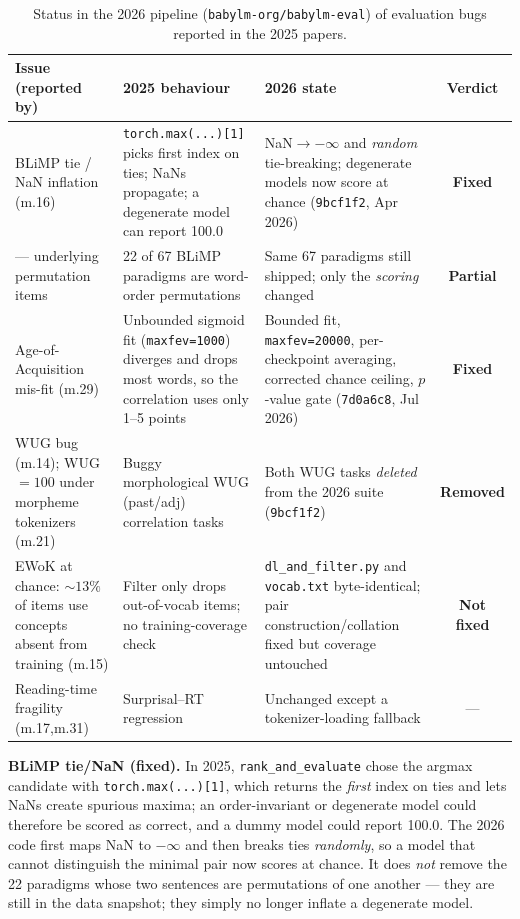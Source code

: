 \documentclass[11pt]{article}
\newcommand{\fixed}{\textcolor{green!55!black}{\textbf{Fixed}}}
\newcommand{\partialx}{\textcolor{orange!85!black}{\textbf{Partial}}}
\newcommand{\notfixed}{\textcolor{red!75!black}{\textbf{Not fixed}}}
\newcommand{\removed}{\textcolor{blue!70!black}{\textbf{Removed}}}
\begin{document}
\begin{table}[h]
\centering\small
\renewcommand{\arraystretch}{1.25}
\begin{tabular}{@{}p{3.3cm} p{4.7cm} p{4.4cm} c@{}}
\toprule
\textbf{Issue (reported by)} & \textbf{2025 behaviour} & \textbf{2026 state} & \textbf{Verdict}\\
\midrule
BLiMP tie / NaN inflation (m.16) &
\texttt{torch.max(...)[1]} picks first index on ties; NaNs propagate; a degenerate model can report 100.0 &
NaN$\to-\infty$ and \emph{random} tie-breaking; degenerate models now score at chance (\texttt{9bcf1f2}, Apr 2026) &
\fixed \\

\quad --- underlying permutation items &
22 of 67 BLiMP paradigms are word-order permutations &
Same 67 paradigms still shipped; only the \emph{scoring} changed &
\partialx \\

Age-of-Acquisition mis-fit (m.29) &
Unbounded sigmoid fit (\texttt{maxfev=1000}) diverges and drops most words, so the correlation uses only 1--5 points &
Bounded fit, \texttt{maxfev=20000}, per-checkpoint averaging, corrected chance ceiling, $p$-value gate (\texttt{7d0a6c8}, Jul 2026) &
\fixed \\

WUG bug (m.14); WUG${=}100$ under morpheme tokenizers (m.21) &
Buggy morphological WUG (past/adj) correlation tasks &
Both WUG tasks \emph{deleted} from the 2026 suite (\texttt{9bcf1f2}) &
\removed \\

EWoK at chance: ${\sim}13\%$ of items use concepts absent from training (m.15) &
Filter only drops out-of-vocab items; no training-coverage check &
\texttt{dl\_and\_filter.py} and \texttt{vocab.txt} byte-identical; pair construction/collation fixed but coverage untouched &
\notfixed \\

Reading-time fragility (m.17,m.31) &
Surprisal--RT regression &
Unchanged except a tokenizer-loading fallback &
--- \\
\bottomrule
\end{tabular}
\caption{Status in the 2026 pipeline (\texttt{babylm-org/babylm-eval}) of evaluation bugs reported
in the 2025 papers.}
\label{tab:bugs}
\end{table}

\textbf{BLiMP tie/NaN (fixed).} In 2025, \texttt{rank\_and\_evaluate} chose the argmax candidate with
\texttt{torch.max(...)[1]}, which returns the \emph{first} index on ties and lets NaNs create spurious
maxima; an order-invariant or degenerate model could therefore be scored as correct, and a dummy model
could report 100.0. The 2026 code first maps NaN to $-\infty$ and then breaks ties \emph{randomly}, so a
model that cannot distinguish the minimal pair now scores at chance. It does \emph{not} remove the 22
paradigms whose two sentences are permutations of one another --- they are still in the data snapshot;
they simply no longer inflate a degenerate model.
\end{document}
